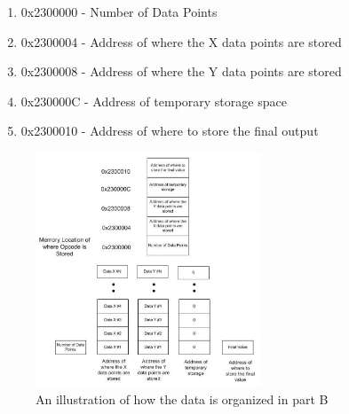 \documentclass[letterpaper]{article}
\begin{document}
    \begin{enumerate}
      \item 0x2300000 - Number of Data Points
      \item 0x2300004 - Address of where the X data points are stored
      \item 0x2300008 - Address of where the Y data points are stored
      \item 0x230000C - Address of temporary storage space
      \item 0x2300010 - Address of where to store the final output
    \end{enumerate}

    \begin{figure}[h!]
      \centering
      \includegraphics[width=0.6\textwidth]{memb.jpg}
      \caption{An illustration of how the data is organized in part B}
    \end{figure}
\end{document}
